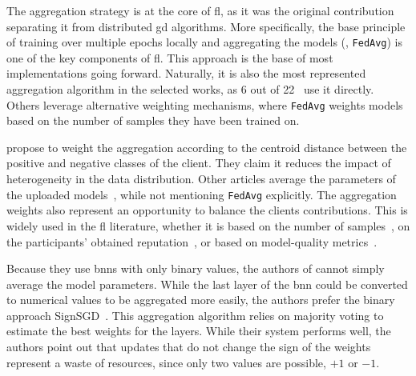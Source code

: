 The aggregation strategy is at the core of \gls{fl}, as it was the original contribution~\cite{mcmahan_Communicationefficientlearningdeep_2017} separating it from distributed \gls{gd} algorithms.
More specifically, the base principle of training over multiple epochs locally and aggregating the models (\ie, \texttt{FedAvg}) is one of the key components of \gls{fl}.
This approach is the base of most implementations going forward.
Naturally, it is also the most represented aggregation algorithm in the selected works, as 6 out of 22~\cite{nguyen_DIoTFederatedSelflearning_2019,popoola_FederatedDeepLearning_2021a,qin_FederatedLearningBasedNetwork_2021,al-athbaal-marri_FederatedMimicLearning_2020,kim_CollaborativeAnomalyDetection_2020,rahman_InternetThingsIntrusion_2020} use it directly.
Others leverage alternative weighting mechanisms, where \texttt{FedAvg} weights models based on the number of samples they have been trained on.

\textcite{zhang_BlockchainbasedFederatedLearning_2020} propose to weight the aggregation according to the centroid distance between the positive and negative classes of the client.
They claim it reduces the impact of heterogeneity in the data distribution.
Other articles average the parameters of the uploaded models~\cite{schneble_Attackdetectionusing_2019,chen_Networkanomalydetection_2020}, while not mentioning \texttt{FedAvg} explicitly.
The aggregation weights also represent an opportunity to balance the clients contributions.
This is widely used in the \gls{fl} literature, whether it is based on the number of samples~\cite{mcmahan_Communicationefficientlearningdeep_2017}, on the participants' obtained reputation~\cite{wang_FLAREDefendingFederated_2022,wang_ReputationenabledFederatedLearning_2021}, or based on model-quality metrics~\cite{deng_FAIRQualityAwareFederated_2021}.

Because they use \glspl{bnn} with only binary values, the authors of \cite{qin_LineSpeedScalableIntrusion_2020a} cannot simply average the model parameters.
While the last layer of the \gls{bnn} could be converted to numerical values to be aggregated more easily, the authors prefer the binary approach SignSGD~\cite{bernstein_signSGDCompressedoptimisation_2018}.
This aggregation algorithm relies on majority voting to estimate the best weights for the layers.
While their system performs well, the authors point out that updates that do not change the sign of the weights represent a waste of resources, since only two values are possible, $+1$ or $-1$.

